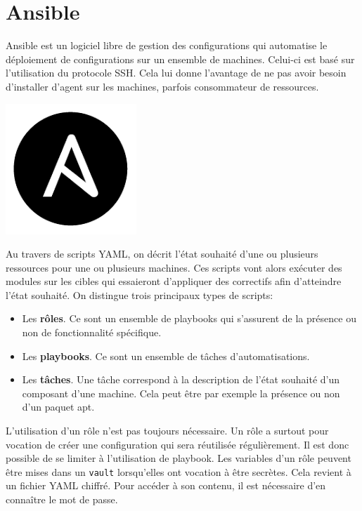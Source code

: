 \documentclass[12pt, a4paper, twoside]{article}
\begin{document}
\section{Ansible}
\noindent%
\begin{minipage}{.8\textwidth}%
\gls{Ansible} est un logiciel libre de gestion des configurations qui automatise le déploiement de configurations sur un ensemble de machines. 
Celui-ci est basé sur l'utilisation du protocole SSH. 
Cela lui donne l'avantage de ne pas avoir besoin d'installer d'agent sur les machines, parfois consommateur de ressources. \\

\end{minipage}%
\hfill
\begin{minipage}{.2\textwidth}%
\begin{center}
\includegraphics[scale=0.3]{src/logo_ansible.png}
\end{center}
\end{minipage}%

Au travers de scripts YAML, on décrit l'état souhaité d'une ou plusieurs ressources pour une ou plusieurs machines. 
Ces scripts vont alors exécuter des modules sur les cibles qui essaieront d'appliquer des correctifs afin d'atteindre l'état souhaité. 
On distingue trois principaux types de scripts:
\begin{itemize}
    \item Les \textbf{rôles}. Ce sont un ensemble de playbooks qui s'assurent de la présence ou non de fonctionnalité spécifique.
    \item Les \textbf{playbooks}. Ce sont un ensemble de tâches d'automatisations.
    \item Les \textbf{tâches}. Une tâche correspond à la description de l'état souhaité d'un composant d'une machine. 
    Cela peut être par exemple la présence ou non d'un paquet apt.
\end{itemize}

L'utilisation d'un rôle n'est pas toujours nécessaire. 
Un rôle a surtout pour vocation de créer une configuration qui sera réutilisée régulièrement. 
Il est donc possible de se limiter à l'utilisation de playbook.
Les variables d'un rôle peuvent être mises dans un \texttt{vault} lorsqu'elles ont vocation à être secrètes. 
Cela revient à un fichier YAML chiffré.
Pour accéder à son contenu, il est nécessaire d'en connaître le mot de passe. 
\end{document}
